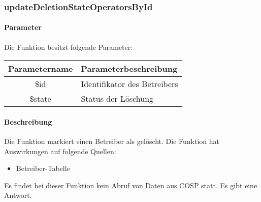 \subsubsection{updateDeletionStateOperatorsById}
\paragraph{Parameter} Die Funktion besitzt folgende Parameter:
\begin{table}[H]
	\begin{tabular}{|c|p{11cm}|}
		\hline
		\textbf{Parametername} & \textbf{Parameterbeschreibung} \\ \hline
		\$id    & Identifikator des Betreibers \\ \hline
		\$state & Status der Löschung \\ \hline
	\end{tabular}
\end{table}
\paragraph{Beschreibung} Die Funktion markiert einen Betreiber als gelöscht. Die Funktion hat Auswirkungen auf folgende Quellen:
\begin{itemize}
	\item Betreiber-Tabelle
\end{itemize}
Es findet bei dieser Funktion kein Abruf von Daten aus {\glqq COSP\grqq} statt. Es gibt eine Antwort.